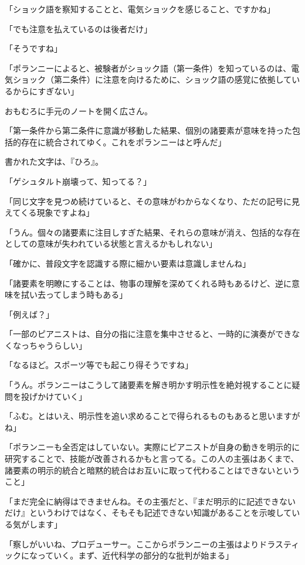 \documentclass[paper=b5j]{jlreq}
\begin{document}
「ショック語を察知することと、電気ショックを感じること、ですかね」

「でも注意を払えているのは後者だけ」

「そうですね」

「ポランニーによると、被験者がショック語（第一条件）を知っているのは、電気ショック（第二条件）に注意を向けるために、ショック語の感覚に依拠しているからにすぎない\cite[27]{polanyi1966ja}」

おもむろに手元のノートを開く広さん。

「第一条件から第二条件に意識が移動した結果、個別の諸要素が意味を持った包括的存在に統合されてゆく。これをポランニーはと呼んだ\cite[33]{polanyi1966ja}」


書かれた文字は、『ひろ』。

「ゲシュタルト崩壊\cite{gestaltzerfall}って、知ってる？」

「同じ文字を見つめ続けていると、その意味がわからなくなり、ただの記号に見えてくる現象ですよね」

「うん。個々の諸要素に注目しすぎた結果、それらの意味が消え、包括的な存在としての意味が失われている状態と言えるかもしれない」

「確かに、普段文字を認識する際に細かい要素は意識しませんね」

「諸要素を明瞭にすることは、物事の理解を深めてくれる時もあるけど、逆に意味を拭い去ってしまう時もある」

「例えば？」

「一部のピアニストは、自分の指に注意を集中させると、一時的に演奏ができなくなっちゃうらしい\cite[41]{polanyi1966ja}」

「なるほど。スポーツ等でも起こり得そうですね」

「うん。ポランニーはこうして諸要素を解き明かす明示性を絶対視することに疑問を投げかけていく」


「ふむ。とはいえ、明示性を追い求めることで得られるものもあると思いますがね」

「ポランニーも全否定はしていない。実際にピアニストが自身の動きを明示的に研究することで、技能が改善されるかもと言ってる\cite[42]{polanyi1966ja}。この人の主張はあくまで、諸要素の明示的統合と暗黙的統合はお互いに取って代わることはできないということ」

「まだ完全に納得はできませんね。その主張だと、『まだ明示的に記述できないだけ』というわけではなく、そもそも記述できない知識があることを示唆している気がします」

「察しがいいね、プロデューサー。ここからポランニーの主張はよりドラスティックになっていく。まず、近代科学の部分的な批判が始まる」
\end{document}
